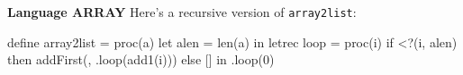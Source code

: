 \begin{minipage}[t]{\sw}
\slidenumber
\LARGE
{\bf Language ARRAY}\exx
Here's a recursive version of \verb'array2list':
\begin{qv}
define array2list = proc(a)
  let
    alen = len(a)
  in
    letrec
      loop = proc(i)
        if <?(i, alen)
        then addFirst(\a[i], .loop(add1(i)))
        else []
    in
      .loop(0)
\end{qv}
\end{minipage}
